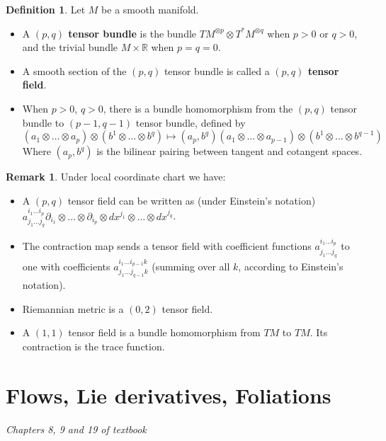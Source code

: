 \documentclass{article}
\theoremstyle{definition}
\newtheorem{dfn}[thm]{Definition}
\newtheorem{rmk}[thm]{Remark}
\begin{document}
\begin{dfn}
    Let $M$ be a smooth manifold.
    \begin{itemize}
        \item A {\bf $(p, q)$ tensor bundle} is the bundle $TM^{\otimes p}\otimes T^*M^{\otimes q}$ when $p>0$ or $q>0$, and the trivial bundle $M\times\mathbb{R}$ when $p=q=0$.
        \item A smooth section of the $(p, q)$ tensor bundle is called a {\bf $(p, q)$ tensor field}.
        \item When $p>0$, $q>0$, there is a bundle homomorphism from the $(p, q)$ tensor bundle to $(p-1, q-1)$ tensor bundle, defined by 
        \[(a_1\otimes\dots\otimes a_p)\otimes (b^1\otimes \dots \otimes b^q)\mapsto (a_p, b^q)(a_1\otimes \dots \otimes a_{p-1})\otimes (b^1\otimes \dots \otimes b^{q-1})\]
        Where $(a_p, b^q)$ is the bilinear pairing between tangent and cotangent spaces.
    \end{itemize}
\end{dfn}

\begin{rmk}
    Under local coordinate chart we have:
    \begin{itemize}
        \item A $(p, q)$ tensor field can be written as (under Einstein's notation) $a^{i_1\dots i_p}_{j_1\dots j_q}\partial_{i_1}\otimes\dots\otimes \partial_{i_p}\otimes dx^{j_1}\otimes \dots \otimes dx^{j_q}$.
        \item The contraction map sends a tensor field with coefficient functions $a^{i_1\dots i_p}_{j_1\dots j_q}$ to one with coefficients $a^{i_1\dots i_{p-1}k}_{j_1\dots j_{q-1}k}$ (summing over all $k$, according to Einstein's notation).
        \item Riemannian metric is a $(0, 2)$ tensor field.
        \item A $(1, 1)$ tensor field is a bundle homomorphism from $TM$ to $TM$. Its contraction is the trace function.
    \end{itemize}
\end{rmk}


\newpage

\section{Flows, Lie derivatives, Foliations}

{\em Chapters 8, 9 and 19 of textbook}\\
\end{document}
